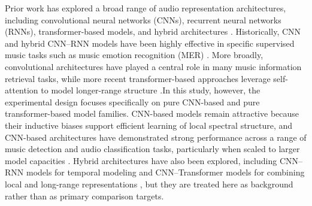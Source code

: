 \documentclass[sigconf]{acmart}
\begin{document}
Prior work has explored a broad range of audio representation architectures, including convolutional neural networks (CNNs), recurrent neural networks (RNNs), transformer-based models, and hybrid architectures \cite{zaman2023}. Historically, CNN and hybrid CNN–RNN models have been highly effective in specific supervised music tasks such as music emotion recognition (MER) \cite{jiang2024}. More broadly, convolutional architectures have played a central role in many music information retrieval tasks, while more recent transformer-based approaches leverage self-attention to model longer-range structure \cite{zaman2023}.In this study, however, the experimental design focuses specifically on pure CNN-based and pure transformer-based model families. CNN-based models remain attractive because their inductive biases support efficient learning of local spectral structure, and CNN-based architectures have demonstrated strong performance across a range of music detection and audio classification tasks, particularly when scaled to larger model capacities \cite{kong2020panns}. Hybrid architectures have also been explored, including CNN--RNN models for temporal modeling \cite{lin2024} and CNN--Transformer models for combining local and long-range representations \cite{pourmoazemi2024}, but they are treated here as background rather than as
primary comparison targets.
\end{document}
